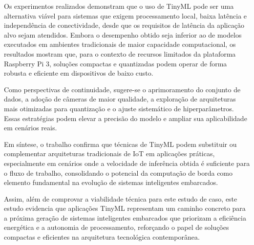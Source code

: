 \documentclass[repeatfields,xlists,xpacks,oneside]{ufrgscca}
\begin{document}
Os experimentos realizados demonstram que o uso de TinyML pode ser uma alternativa viável para sistemas que exigem processamento local, baixa latência e independência de conectividade, desde que os requisitos de latência da aplicação alvo sejam atendidos. Embora o desempenho obtido seja inferior ao de modelos executados em ambientes tradicionais de maior capacidade computacional, os resultados mostram que, para o contexto de recursos limitados da plataforma Raspberry Pi 3, soluções compactas e quantizadas podem operar de forma robusta e eficiente em dispositivos de baixo custo.

Como perspectivas de continuidade, sugere-se o aprimoramento do conjunto de dados, a adoção de câmeras de maior qualidade, a exploração de arquiteturas mais otimizadas para quantização e o ajuste sistemático de hiperparâmetros. Essas estratégias podem elevar a precisão do modelo e ampliar sua aplicabilidade em cenários reais.

Em síntese, o trabalho confirma que técnicas de TinyML podem substituir ou complementar arquiteturas tradicionais de IoT em aplicações práticas, especialmente em cenários onde a velocidade de inferência obtida é suficiente para o fluxo de trabalho, consolidando o potencial da computação de borda como elemento fundamental na evolução de sistemas inteligentes embarcados.

Assim, além de comprovar a viabilidade técnica para este estudo de caso, este estudo evidencia que aplicações TinyML representam um caminho concreto para a próxima geração de sistemas inteligentes embarcados que priorizam a eficiência energética e a autonomia de processamento, reforçando o papel de soluções compactas e eficientes na arquitetura tecnológica contemporânea.

\printbibliography
\end{document}

